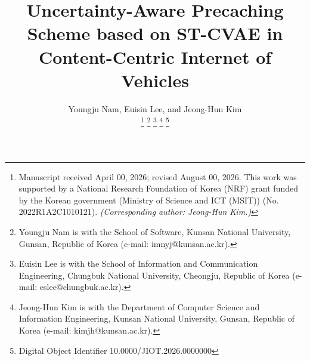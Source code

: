 \documentclass[journal]{IEEEtran}
\begin{document}
\title{Uncertainty-Aware Precaching Scheme based on ST-CVAE in Content-Centric Internet of Vehicles}
\newcommand{\orcidauthorA}{0000-0003-3971-0715} %
\newcommand{\orcidauthorB}{0000-0002-0422-0647} %
\newcommand{\orcidauthorC}{0000-0001-8209-5944} %

\author{Youngju Nam, Euisin Lee, and Jeong-Hun Kim

\thanks{Manuscript received April 00, 2026; revised August 00, 2026.
This work was supported by a National Research Foundation of Korea (NRF) grant funded by the Korean government (Ministry of Science and ICT (MSIT)) (No. 2022R1A2C1010121). \textit{(Corresponding author: Jeong-Hun Kim.)}}
\thanks{Youngju Nam is with the School of Software, Kunsan National University, Gunsan, Republic of Korea (e-mail: imnyj@kunsan.ac.kr).}
\thanks{Euisin Lee is with the School of Information and Communication Engineering, Chungbuk National University, Cheongju, Republic of Korea (e-mail: eslee@chungbuk.ac.kr).}
\thanks{Jeong-Hun Kim is with the Department of Computer Science and Information Engineering, Kunsan National University, Gunsan, Republic of Korea (e-mail: kimjh@kunsan.ac.kr).}
\thanks{Digital Object Identifier 10.0000/JIOT.2026.0000000}}

\end{document}
